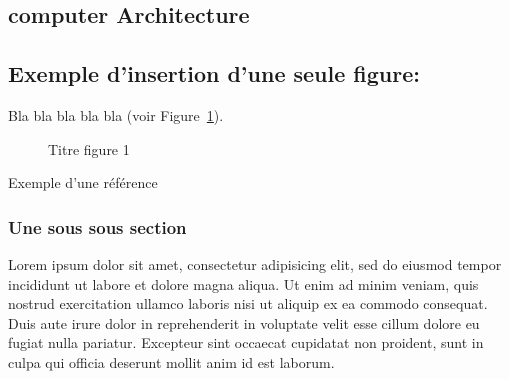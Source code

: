 \subsection{computer Architecture}



\subsection{Exemple d'insertion d'une seule figure:}

Bla bla bla bla bla (voir Figure~\ref{fig:Allmagne}).

 \begin{figure} [h!]%
 	\vspace*{13pt}
 	\vspace*{13pt}               
 	\caption{Titre figure 1} 
 	\label{fig:Allmagne}
 \end{figure} 



Exemple d'une référence \cite{zadeh1978fuzzy}

\subsubsection{Une sous sous section}
Lorem ipsum dolor sit amet, consectetur adipisicing elit, sed do eiusmod
tempor incididunt ut labore et dolore magna aliqua. Ut enim ad minim veniam,
quis nostrud exercitation ullamco laboris nisi ut aliquip ex ea commodo
consequat. Duis aute irure dolor in reprehenderit in voluptate velit esse
cillum dolore eu fugiat nulla pariatur. Excepteur sint occaecat cupidatat non
proident, sunt in culpa qui officia deserunt mollit anim id est laborum.

